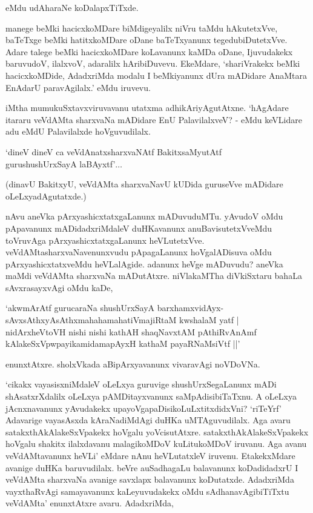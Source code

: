 eMdu udAharaNe koDalapxTiTxde.

manege beMki hacicxkoMDare biMdigeyalilx niVru taMdu hAkutetxVve, baTeTxge beMki hatitxkoMDare oDane baTeTxyanunx tegedubiDutetxVve. Adare talege beMki hacicxkoMDare koLavanunx kaMDa oDane, Ijuvudakekx baruvudoV, ilalxvoV, adaralilx hAribiDuvevu. EkeMdare, `shariVrakekx beMki hacicxkoMDide, AdadxriMda modalu I beMkiyanunx dUra mADidare AnaMtara EnAdarU paravAgilalx.' eMdu iruvevu.

iMtha mumukuSxtavxviruvavanu utatxma adhikAriyAgutAtxne. `hAgAdare itararu veVdAMta sharxvaNa mADidare EnU PalavilalxveV? - eMdu keVLidare adu eMdU Palavilalxde hoVguvudilalx.

\begin{shloka}
`dineV dineV ca veVdAnatxsharxvaNAtf BakitxsaMyutAtf\\
gurushushUrxSayA laBAyxtf'$\ldots$ 
\end{shloka}

(dinavU BakitxyU, veVdAMta sharxvaNavU kUDida guruseVve mADidare oLeLxyadAgutatxde.)

nAvu aneVka pArxyashicxtatxgaLanunx mADuvuduMTu. yAvudoV oMdu pApavanunx mADidadxriMdaleV duHKavanunx anuBavisutetxVveMdu toVruvAga pArxyashicxtatxgaLanunx heVLutetxVve. veVdAMtasharxvaNavenunxvudu pApagaLanunx hoVgalADisuva oMdu pArxyashicxtatxveMdu heVLalAgide. adanunx heVge mADuvudu? aneVka maMdi veVdAMta sharxvaNa mADutAtxre. niVlakaMTha diVkiSxtaru bahaLa sAvxrasayxvAgi oMdu kaDe,

\begin{shloka}
`akwmArAtf gurucaraNa shushUrxSayA barxhamxvidAyx-\\
sAvxsAthxyAsAthxmahahamahatiVmajiRtaM kwshalaM yatf |\\
nidArxheVtoVH nishi nishi kathAH shaqNavxtAM pAthiRvAnAmf\\
kAlakeSxVpwpayikamidamapAyxH kathaM payaRNaMsiVtf ||'
\end{shloka}

enunxtAtxre. sholxVkada aBipArxyavanunx vivaravAgi noVDoVNa.

`cikakx vayasisxniMdaleV oLeLxya guruvige shushUrxSegaLanunx mADi shAsatxrXdalilx oLeLxya pAMDitayxvanunx saMpAdisibiTaTxnu. A oLeLxya jAcnxnavanunx yAvudakekx upayoVgapaDisikoLuLxtitxdidxVni? `riTeYrf' Adavarige vayasAsxda kAraNadiMdAgi duHKa uMTAguvudilalx. Aga avaru satakxthAkAlakeSxVpakekx hoVgalu yoVcisutAtxre. satakxthAkAlakeSxVpakekx hoVgalu shakitx ilalxdavanu malagikoMDoV kuLitukoMDoV iruvanu. Aga avanu veVdAMtavanunx heVLi' eMdare nAnu heVLutatxleV iruvenu. EtakekxMdare avanige duHKa baruvudilalx. beVre auSadhagaLu balavanunx koDadidadxrU I veVdAMta sharxvaNa avanige savxlapx balavanunx koDutatxde. AdadxriMda vayxthaRvAgi samayavanunx kaLeyuvudakekx oMdu sAdhanavAgibiTiTxtu veVdAMta' enunxtAtxre avaru. AdadxriMda,

